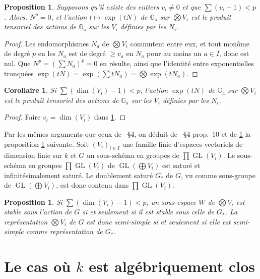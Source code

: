 \documentclass[11pt,a4paper]{article}
\theoremstyle{plain}
\newtheorem{proposition}[theorem]{Proposition}
\newtheorem{corollary}[theorem]{Corollaire}
\theoremstyle{definition}
\DeclareMathOperator{\GL}{GL}
\newcommand{\Ga}{\mathbb{G}_\mathrm{a}}
\begin{document}
\begin{proposition}\label{prop:2.2}
Supposons qu'il existe des entiers $v_i \neq 0$ et que $\sum (v_i - 1) < p$. Alors, $N^p = 0$, et l'action $t \mapsto \exp(tN)$ de $\Ga$ sur $\bigotimes V_i$ est le produit tensoriel des actions de $\Ga$ sur les $V_i$ d\'efinies par les $N_i$.
\end{proposition}

\begin{proof}
Les endomorphismes $N_a$ de $\bigotimes V_i$ commutent entre eux, et tout mon\^ome de degr\'e $p$ en les $N_a$ est de degr\'e $\geq v_a$ en $N_a$ pour au moins un $a \in I$, donc est nul. Que $N^p = (\sum N_a)^p = 0$ en r\'esulte, ainsi que l'identit\'e entre exponentielles tronqu\'ees $\exp(tN) = \exp(\sum tN_a) = \bigotimes \exp(tN_a)$.
\end{proof}

\begin{corollary}\label{cor:2.3}
Si $\sum (\dim(V_i) - 1) < p$, l'action $\exp(tN)$ de $\Ga$ sur $\bigotimes V_i$ est le produit tensoriel des actions de $\Ga$ sur les $V_i$ d\'efinies par les $N_i$.
\end{corollary}

\begin{proof}
Faire $v_i = \dim(V_i)$ dans \ref{prop:2.2}.
\end{proof}

Par les m\^emes arguments que ceux de \cite{Serre1994}~\S4, on d\'eduit de \cite{Serre1994}~\S4 prop.~10 et de \ref{cor:2.3} la proposition \ref{prop:2.4} suivante. Soit $(V_i)_{i \in I}$ une famille finie d'espaces vectoriels de dimension finie sur $k$ et $G$ un sous-sch\'ema en groupes de $\prod \GL(V_i)$. Le sous-sch\'ema en groupes $\prod \GL(V_i)$ de $\GL(\bigoplus V_i)$ est satur\'e et infinit\'esimalement satur\'e. Le doublement satur\'e $G_*$ de $G$, vu comme sous-groupe de $\GL(\bigoplus V_i)$, est donc contenu dans $\prod \GL(V_i)$.

\begin{proposition}\label{prop:2.4}
Si $\sum (\dim(V_i) - 1) < p$, un sous-espace $W$ de $\bigotimes V_i$ est stable sous l'action de $G$ si et seulement si il est stable sous celle de $G_*$. La repr\'esentation $\bigotimes V_i$ de $G$ est donc semi-simple si et seulement si elle est semi-simple comme repr\'esentation de $G_*$.
\end{proposition}

\section{Le cas o\`u $k$ est alg\'ebriquement clos}\label{sec:3}
\end{document}
